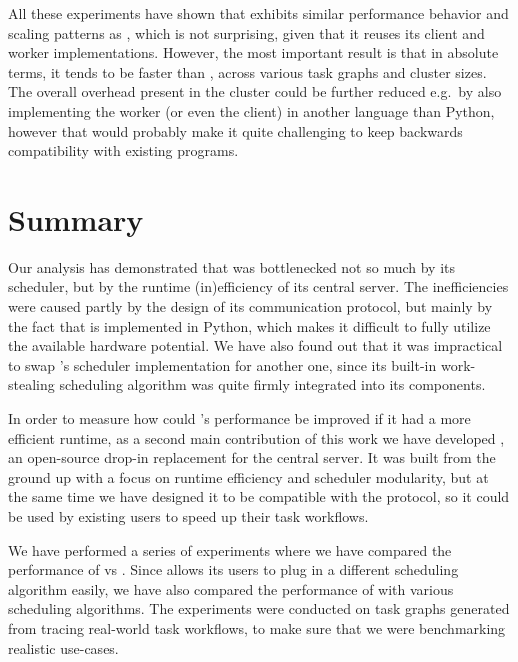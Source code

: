 All these experiments have shown that \rsds{} exhibits similar performance behavior and scaling
patterns as \dask{}, which is not surprising, given that it reuses its client and worker
implementations. However, the most important result is that in absolute terms, it tends to be
faster than \dask{}, across various task graphs and cluster sizes. The overall overhead present
in the \dask{} cluster could be further reduced e.g.\ by also implementing the worker (or even
the client) in another language than Python, however that would probably make it quite
challenging to keep backwards compatibility with existing \dask{} programs.

\section{Summary}

Our analysis has demonstrated that \dask{} was bottlenecked not so much by its
scheduler, but by the runtime (in)efficiency of its central server. The inefficiencies were caused
partly by the design of its communication protocol, but mainly by the fact that
\dask{} is implemented in Python, which makes it difficult to fully utilize the
available hardware potential. We have also found out that it was impractical to swap
\dask{}'s scheduler implementation for another one, since its built-in
work-stealing scheduling algorithm was quite firmly integrated into its components.

In order to measure how could \dask{}'s performance be improved if it had a
more efficient runtime, as a second main contribution of this work we have developed
\rsds{}, an open-source drop-in replacement for the \dask{}
central server. It was built from the ground up with a focus on runtime
efficiency and scheduler modularity, but at the same time we have designed it to be compatible with
the \dask{} protocol, so it could be used by existing
\dask{} users to speed up their task workflows.

We have performed a series of experiments where we have compared the performance of
\rsds{} vs \dask{}. Since \rsds{}
allows its users to plug in a different scheduling algorithm easily, we have also compared the
performance of \rsds{} with various scheduling algorithms. The experiments were
conducted on task graphs generated from tracing real-world \dask{} task
workflows, to make sure that we were benchmarking realistic use-cases.


